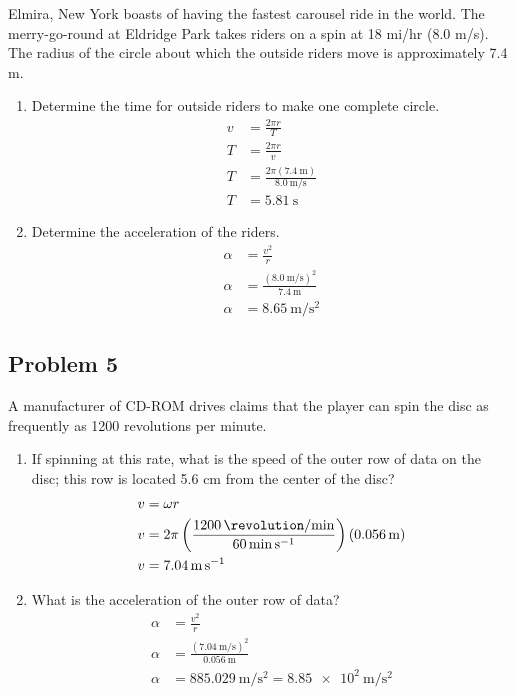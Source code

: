 \documentclass{article}
\begin{document}
Elmira, New York boasts of having the fastest carousel ride in the world. The merry-go-round at Eldridge Park takes riders on a spin at 18 mi/hr (8.0 m/s). The radius of the circle about which the outside riders move is approximately 7.4 m.
\begin{enumerate}[label = \textbf{\alph*.}]
	\item Determine the time for outside riders to make one complete circle.
		\begin{align*}
			v & = \frac{ 2\pi r }{ T } \\
			T & = \frac{ 2\pi r }{ v } \\
			T & = \frac{ 2\pi (\SI{7.4}{\meter}) }{ \SI{8.0}{\meter \per \second} } \\
			T & = \SI{5.81}{\second}
		\end{align*}
	\item Determine the acceleration of the riders.
		\begin{align*}
			\alpha & = \frac{ v^2 }{ r } \\
			\alpha & = \frac{ (\SI{8.0}{\meter \per \second})^2 }{ \SI{7.4}{\meter} } \\
			\alpha & = \SI{8.65}{\meter \per \second \squared}
		\end{align*}
\end{enumerate}

\subsection{Problem 5}

A manufacturer of CD-ROM drives claims that the player can spin the disc as frequently as 1200 revolutions per minute.
\begin{enumerate}[label = \textbf{\alph*.}]
	\item If spinning at this rate, what is the speed of the outer row of data on the disc; this row is located 5.6 cm from the center of the disc?
		\begin{align*}
			v & = \omega r \\
			v & = 2\pi \left( \frac{ \SI{1200}{\revolution \per \minute} }{ \SI{60}{\minute \per \second} } \right) (\SI{0.056}{\meter}) \\
			v & = \SI{7.04}{\meter \per \second}
		\end{align*}
	\item What is the acceleration of the outer row of data?
		\begin{align*}
			\alpha & = \frac{ v^2 }{ r } \\
			\alpha & = \frac{ (\SI{7.04}{\meter \per \second})^2 }{ \SI{0.056}{\meter} } \\
			\alpha & = \SI{885.029}{\meter \per \second \squared} = \SI{8.85e2}{\meter \per \second \squared}
		\end{align*}
\end{enumerate}
\end{document}
